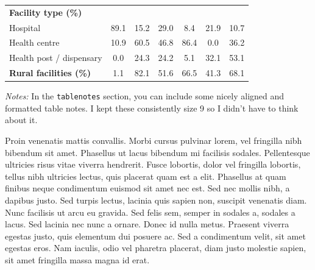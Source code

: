 \begin{landscape}
\begin{table}[H]
\begin{singlespace}
\begin{threeparttable}
\begin{tabular}{lcccccc}
\textbf{Facility type (\%)} & & & & & & \\
\quad Hospital & 89.1 & 15.2 & 29.0 & 8.4 & 21.9 & 10.7 \\
\quad Health centre & 10.9 & 60.5 & 46.8 & 86.4 & 0.0 & 36.2 \\
\quad Health post / dispensary & 0.0 & 24.3 & 24.2 & 5.1 & 32.1 & 53.1 \\

\textbf{Rural facilities (\%)} 
& 1.1 & 82.1 & 51.6 & 66.5 & 41.3 & 68.1 \\

\bottomrule
\end{tabular}

\begin{tablenotes}[flushleft]
\fontsize{9pt}{10.5pt}\selectfont
\item \textit{Notes:} In the \texttt{tablenotes} section, you can include some nicely aligned and formatted table notes. I kept these consistently size 9 so I didn't have to think about it.  
\end{tablenotes}

\end{threeparttable}
\end{singlespace}
\end{table}
\end{landscape}

 Proin venenatis mattis convallis. Morbi cursus pulvinar lorem, vel fringilla nibh bibendum sit amet. Phasellus ut lacus bibendum mi facilisis sodales. Pellentesque ultricies risus vitae viverra hendrerit. Fusce lobortis, dolor vel fringilla lobortis, tellus nibh ultricies lectus, quis placerat quam est a elit. Phasellus at quam finibus neque condimentum euismod sit amet nec est. Sed nec mollis nibh, a dapibus justo. Sed turpis lectus, lacinia quis sapien non, suscipit venenatis diam. Nunc facilisis ut arcu eu gravida. Sed felis sem, semper in sodales a, sodales a lacus. Sed lacinia nec nunc a ornare. Donec id nulla metus. Praesent viverra egestas justo, quis elementum dui posuere ac. Sed a condimentum velit, sit amet egestas eros. Nam iaculis, odio vel pharetra placerat, diam justo molestie sapien, sit amet fringilla massa magna id erat.

